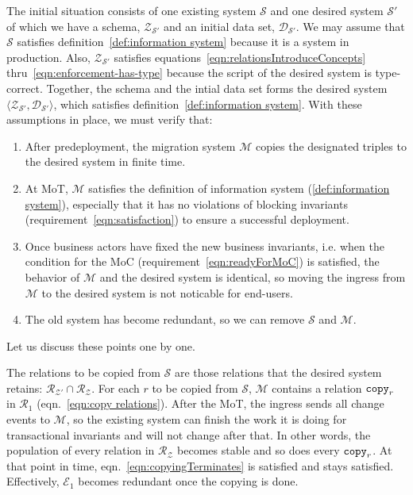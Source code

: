 \documentclass[runningheads]{llncs}
\newcommand{\pair}[2]{\langle{#1},{#2}\rangle}
\newcommand{\rels}{\mathcal{R}}   %
\newcommand{\transactions}{\mathcal{E}}
\newcommand{\dataset}{\mathscr{D}}
\newcommand{\schema}{\mathscr{Z}}
\newcommand{\migrsys}{\mathscr{M}}
\newcommand{\infsys}{\mathscr{S}}
\begin{document}
   The initial situation consists of one existing system $\infsys$ and one desired system $\infsys'$ of which we have a schema, $\schema_{\infsys'}$ and an initial data set, $\dataset_{\infsys'}$.
   We may assume that $\infsys$ satisfies definition~\ref{def:information system} because it is a system in production.
   Also, $\schema_{\infsys'}$ satisfies equations~\ref{eqn:relationsIntroduceConcepts} thru~\ref{eqn:enforcement-has-type} because the script of the desired system is type-correct.
   Together, the schema and the intial data set forms the desired system $\pair{\schema_{\infsys'}}{\dataset_{\infsys'}}$, which satisfies definition~\ref{def:information system}.
   With these assumptions in place,
   we must verify that:
\begin{enumerate}
\item After predeployment, the migration system $\migrsys$ copies the designated triples to the desired system in finite time.
\item At MoT, $\migrsys$ satisfies the definition of information system (\ref{def:information system}), especially that it has no violations of blocking invariants (requirement~\ref{eqn:satisfaction}) to ensure a successful deployment.
\item Once business actors have fixed the new business invariants, i.e. when the condition for the MoC (requirement~\ref{eqn:readyForMoC}) is satisfied,
   the behavior of $\migrsys$ and the desired system is identical, so moving the ingress from $\migrsys$ to the desired system is not noticable for end-users.
\item The old system has become redundant, so we can remove $\infsys$ and $\migrsys$.
\end{enumerate}
   Let us discuss these points one by one.

   The relations to be copied from $\infsys$ are those relations that the desired system retains: $\rels_{\schema'}\cap\rels_{\schema}$.
   For each $r$ to be copied from $\infsys$, $\migrsys$ contains a relation ${\tt copy}_r$ in $\rels_1$ (eqn.~\ref{eqn:copy relations}).
   After the MoT, the ingress sends all change events to $\migrsys$, so the existing system can finish the work it is doing for transactional invariants and will not change after that.
   In other words, the population of every relation in $\rels_{\schema}$ becomes stable and so does every ${\tt copy}_r$.
   At that point in time, eqn.~\ref{eqn:copyingTerminates} is satisfied and stays satisfied.
   Effectively, $\transactions_1$ becomes redundant once the copying is done.
\end{document}
